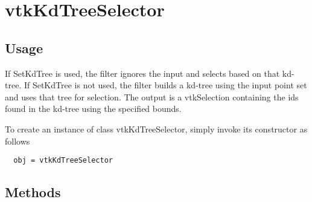 \section{vtkKdTreeSelector}

\subsection{Usage}

 If SetKdTree is used, the filter ignores the input and selects based on that
 kd-tree.  If SetKdTree is not used, the filter builds a kd-tree using the
 input point set and uses that tree for selection.  The output is a
 vtkSelection containing the ids found in the kd-tree using the specified
 bounds.

To create an instance of class vtkKdTreeSelector, simply
invoke its constructor as follows
\begin{verbatim}
  obj = vtkKdTreeSelector
\end{verbatim}
\subsection{Methods}

